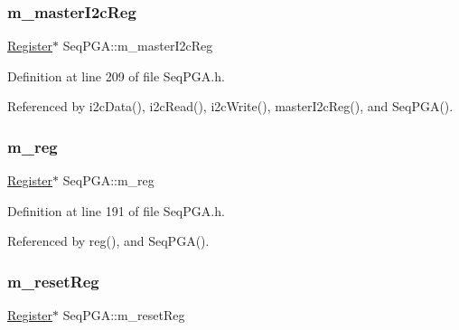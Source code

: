 \mbox{\label{classSeqPGA_a942c71b33a4f43b7a994cb9216abb17e}} 
\subsubsection{\texorpdfstring{m\+\_\+master\+I2c\+Reg}{m\_masterI2cReg}}
{\footnotesize\ttfamily \hyperlink{classRegister}{Register}$\ast$ Seq\+P\+G\+A\+::m\+\_\+master\+I2c\+Reg\hspace{0.3cm}{\ttfamily [private]}}



Definition at line 209 of file Seq\+P\+G\+A.\+h.



Referenced by i2c\+Data(), i2c\+Read(), i2c\+Write(), master\+I2c\+Reg(), and Seq\+P\+G\+A().

\mbox{\label{classSeqPGA_afd827f1d3d55b0a8efafbd79a8c54a52}} 
\subsubsection{\texorpdfstring{m\+\_\+reg}{m\_reg}}
{\footnotesize\ttfamily \hyperlink{classRegister}{Register}$\ast$ Seq\+P\+G\+A\+::m\+\_\+reg\hspace{0.3cm}{\ttfamily [private]}}



Definition at line 191 of file Seq\+P\+G\+A.\+h.



Referenced by reg(), and Seq\+P\+G\+A().

\mbox{\label{classSeqPGA_a8c519e98b992ab872622e95dae4461d8}} 
\subsubsection{\texorpdfstring{m\+\_\+reset\+Reg}{m\_resetReg}}
{\footnotesize\ttfamily \hyperlink{classRegister}{Register}$\ast$ Seq\+P\+G\+A\+::m\+\_\+reset\+Reg\hspace{0.3cm}{\ttfamily [private]}}




